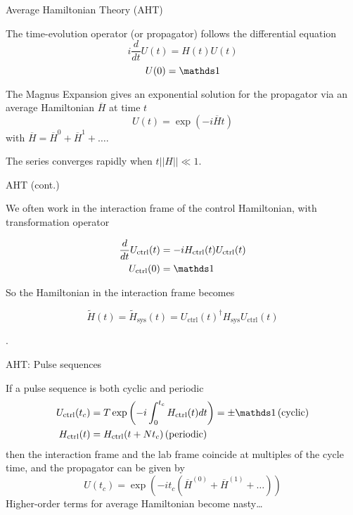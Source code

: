 \documentclass{beamer}
\begin{document}
\begin{frame}{Average Hamiltonian Theory (AHT)}

The time-evolution operator (or propagator) follows the differential
equation \[
i \frac{d}{dt} U(t) = H(t)U(t)
\] \[
U(0) = \identity
\]

The Magnus Expansion gives an exponential solution for the propagator
via an average Hamiltonian \(\overline{H}\) at time \(t\) \[
U(t) = \exp\left( -i \overline{H} t \right)
\] with \(\overline{H} = \overline{H}^0 + \overline{H}^1 + \dots\).

The series converges rapidly when \(t||H|| \ll 1\).

\end{frame}

\begin{frame}{AHT (cont.)}

We often work in the interaction frame of the control Hamiltonian, with transformation operator

\begin{align*}
    \frac{d}{dt} U_{\text{ctrl}}(t) &=
        -i H_{\text{ctrl}}(t)U_{\text{ctrl}}(t) \\
    U_{\text{ctrl}}(0) &= \identity
\end{align*}

So the Hamiltonian in the interaction frame becomes

\[
    \widetilde{H}(t) = \widetilde{H}_{\text{sys}}(t) = U_{\text{ctrl}}(t)^\dagger H_{\text{sys}} U_{\text{ctrl}}(t)
\]

\cite{brinkmann_2016}.
\end{frame}

\begin{frame}{AHT: Pulse sequences}

If a pulse sequence is both cyclic and periodic \cite{gerstein-dybowski}
\begin{align*}
    U_{\text{ctrl}}(t_c) &= T\exp \left(
        -i \int_0^{t_c} H_{\text{ctrl}}(t) dt \right) = \pm \identity
         \, \text{(cyclic)} \\
    H_{\text{ctrl}}(t) &= H_{\text{ctrl}}(t + Nt_c) \, \text{(periodic)}
\end{align*}
then the interaction frame and the lab frame coincide at multiples of
the cycle time, and the propagator can be given by
\[
    U(t_c) = \exp\left( -i t_c (\overline{H}^{(0)} +
        \overline{H}^{(1)} + \dots) \right)
\]
Higher-order terms for average Hamiltonian become nasty\dots

\end{frame}
\end{document}
